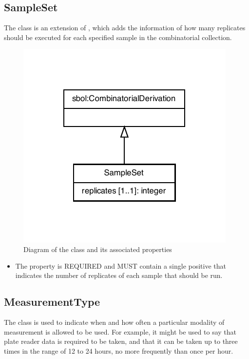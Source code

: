 \subsection{SampleSet}
\label{sec:SampleSet}

The  class is an extension of , which adds the information of how many replicates should be executed for each specified sample in the combinatorial collection.

\begin{figure}[ht]
\begin{center}
\includegraphics[scale=0.8]{figures/SampleSet}
\caption[]{Diagram of the  class and its associated properties}
\label{uml:SampleSet}
\end{center}
\end{figure}

\begin{itemize}
\item \label{sec:replicates}
The  property is REQUIRED and MUST contain a single positive  that indicates the number of replicates of each sample that should be run.
\end{itemize}


\subsection{MeasurementType}
\label{sec:MeasurementType}

The  class is used to indicate when and how often a particular modality of measurement is allowed to be used.
For example, it might be used to say that plate reader data is required to be taken, and that it can be taken up to three times in the range of 12 to 24 hours, no more frequently than once per hour.

